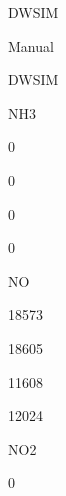 \documentclass[a4paper,portrait,12pt]{article}
\begin{document}
\begin{flushleft}
DWSIM
\end{flushleft}





\begin{flushleft}
Manual
\end{flushleft}





\begin{flushleft}
DWSIM
\end{flushleft}





\begin{flushleft}
NH3
\end{flushleft}





0





0





0





0





\begin{flushleft}
NO
\end{flushleft}





18573





18605





11608





12024





\begin{flushleft}
NO2
\end{flushleft}





0
\end{document}
